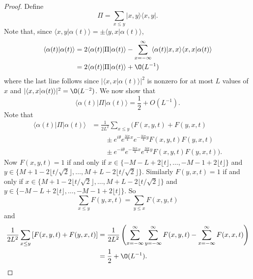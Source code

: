 \documentclass[../thesis-main/thesis-main]{subfiles}
\begin{document}
\begin{proof}
Define
\[
\Pi=\sum_{x\leq y}|x,y\rangle\langle x,y|.
\]
Note that, since $\langle x,y|\alpha(t)\rangle=\pm\langle y,x|\alpha(t)\rangle$,
\begin{align*}
\langle\alpha(t)|\alpha(t)\rangle & = 2\langle\alpha(t)|\Pi|\alpha(t)\rangle-\sum_{x=-\infty}^{\infty}\langle\alpha(t)|x,x\rangle\langle x,x|\alpha(t)\rangle\\
 & = 2\langle\alpha(t)|\Pi|\alpha(t)\rangle+\O(L^{-1})
\end{align*}
where the last line follows since $|\langle x,x|\alpha(t)\rangle|^{2}$
is nonzero for at most $L$ values of $x$ and $|\langle x,x|\alpha(t)\rangle|^{2}=\O(L^{-2})$.
We now show that
\[
\langle\alpha(t)|\Pi|\alpha(t)\rangle=\frac{1}{2}+O(L^{-1}).
\]
Note that
\begin{align*}
\langle\alpha(t)|\Pi|\alpha(t)\rangle &= \frac{1}{2L^{2}}\sum_{x\leq y}\Bigg(F(x,y,t) +F(y,x,t)  \\
&\qquad \pm e^{i\theta}e^{\frac{3i\pi}{4}x}e^{-\frac{3i\pi}{4}y}F(x,y,t) F(y,x,t) \\
&\qquad \pm e^{-i\theta}e^{-\frac{3i\pi}{4}x}e^{\frac{3i\pi}{4}y}F(x,y,t) F(y,x,t) \Bigg).
\end{align*}
Now $F(x,y,t)= 1$ if and only if $x\in\{-M-L+2\lfloor t \rfloor,\ldots,-M-1+2 \lfloor t \rfloor \}$
and $y\in\{M+1-2 \lfloor {t}/{\sqrt{2}} \rfloor ,\ldots,M+L-2 \lfloor {t}/{\sqrt{2}} \rfloor \}$.
Similarly $F(y,x,t) =1$ if and only if $x\in\{M+1-2 \lfloor {t}/{\sqrt{2}} \rfloor ,\ldots,M+L-2 \lfloor {t}/{\sqrt{2}} \rfloor \}$
and $y\in\{-M-L+2 \lfloor t \rfloor ,\ldots,-M-1+2 \lfloor t \rfloor \}$.
So
\[
\sum_{x\leq y}F(y,x,t) =\sum_{y\leq x}F(x,y,t) 
\]
and
\begin{align*}
\frac{1}{2L^{2}}\sum_{x\leq y}\left[F(x,y,t) +F(y,x,t) \right] &= \frac{1}{2L^{2}}\left(\sum_{x=-\infty}^{\infty}\sum_{y=-\infty}^{\infty}F(x,y,t) -\sum_{x=-\infty}^{\infty}F(x,x,t) \right)\\
 &= \frac{1}{2}+\O(L^{-1}).
\end{align*}


\end{proof}
\end{document}
